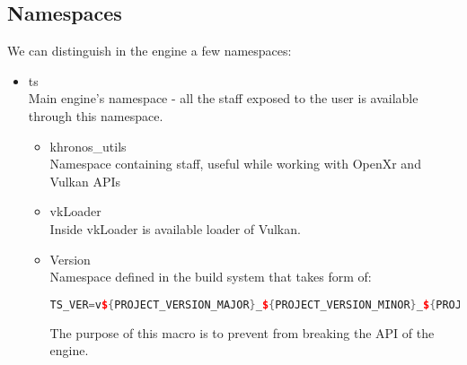 \subsection{Namespaces}
\label{sec:namespaces}
We can distinguish in the engine a few namespaces:
\begin{itemize}
    \item ts\\
    Main engine's namespace - all the staff exposed to the user is available through this namespace.
    \begin{itemize}
        \item khronos\_utils\\
            Namespace containing staff, useful while working with OpenXr and Vulkan APIs
        \item vkLoader\\
            Inside vkLoader is available loader of Vulkan.
        \item Version\\
            Namespace defined in the build system that takes form of:
\begin{lstlisting}[language=c++, caption= Definition of TS\_VER preprocessor macro (.engine/CMakeLists.txt)]
TS_VER=v${PROJECT_VERSION_MAJOR}_${PROJECT_VERSION_MINOR}_${PROJECT_VERSION_PATCH}
\end{lstlisting}
            The purpose of this macro is to prevent from breaking the API of the engine.
    \end{itemize}
\end{itemize}